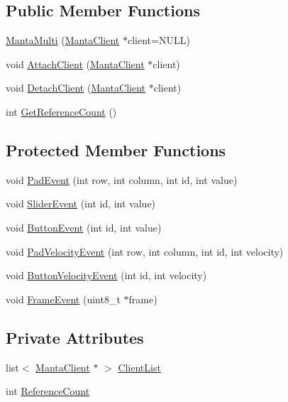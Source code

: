 \subsection*{\-Public \-Member \-Functions}
\begin{DoxyCompactItemize}
\item 
\hyperlink{classMantaMulti_ab7831ace1d2f13abd3be585cf349b604}{\-Manta\-Multi} (\hyperlink{classMantaClient}{\-Manta\-Client} $\ast$client=\-N\-U\-L\-L)
\item 
void \hyperlink{classMantaMulti_aa4d26792bfe430ed8ebb3b08af58682c}{\-Attach\-Client} (\hyperlink{classMantaClient}{\-Manta\-Client} $\ast$client)
\item 
void \hyperlink{classMantaMulti_adf02319b5fef663e5a1f7832045c8765}{\-Detach\-Client} (\hyperlink{classMantaClient}{\-Manta\-Client} $\ast$client)
\item 
int \hyperlink{classMantaMulti_a142a7ff63911f0815737ef49f8c49fd8}{\-Get\-Reference\-Count} ()
\end{DoxyCompactItemize}
\subsection*{\-Protected \-Member \-Functions}
\begin{DoxyCompactItemize}
\item 
void \hyperlink{classMantaMulti_a177fc922321a9f6a3f621a7e0f17dd29}{\-Pad\-Event} (int row, int column, int id, int value)
\item 
void \hyperlink{classMantaMulti_aa509dbf54ad54c04135655c50129f5d2}{\-Slider\-Event} (int id, int value)
\item 
void \hyperlink{classMantaMulti_a983acc709ba1d7be22f4af43f5a8e576}{\-Button\-Event} (int id, int value)
\item 
void \hyperlink{classMantaMulti_ac5cc01c9b9e438ebade78996d9522b6e}{\-Pad\-Velocity\-Event} (int row, int column, int id, int velocity)
\item 
void \hyperlink{classMantaMulti_a95fdd88f8420558071642ef3a2dcdba4}{\-Button\-Velocity\-Event} (int id, int velocity)
\item 
void \hyperlink{classMantaMulti_acd209c1035ea4612b46a341481cdc5fa}{\-Frame\-Event} (uint8\-\_\-t $\ast$frame)
\end{DoxyCompactItemize}
\subsection*{\-Private \-Attributes}
\begin{DoxyCompactItemize}
\item 
list$<$ \hyperlink{classMantaClient}{\-Manta\-Client} $\ast$ $>$ \hyperlink{classMantaMulti_aa1496399438a6043a3893ded1d1cb697}{\-Client\-List}
\item 
int \hyperlink{classMantaMulti_a3686797c3b768fca3dd9e2fc55de05ee}{\-Reference\-Count}
\end{DoxyCompactItemize}


